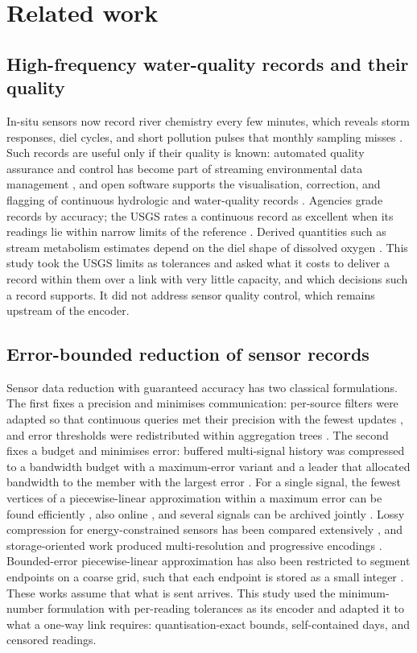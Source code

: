 \section{Related work}
\label{sec:related}

\subsection{High-frequency water-quality records and their quality}
In-situ sensors now record river chemistry every few minutes, which reveals storm responses, diel cycles, and short pollution pulses that monthly sampling misses \citep{rode2016}. Such records are useful only if their quality is known: automated quality assurance and control has become part of streaming environmental data management \citep{campbell2013}, and open software supports the visualisation, correction, and flagging of continuous hydrologic and water-quality records \citep{horsburgh2015}. Agencies grade records by accuracy; the USGS rates a continuous record as excellent when its readings lie within narrow limits of the reference \citep{wagner2006}. Derived quantities such as stream metabolism estimates depend on the diel shape of dissolved oxygen \citep{appling2018}. This study took the USGS limits as tolerances and asked what it costs to deliver a record within them over a link with very little capacity, and which decisions such a record supports. It did not address sensor quality control, which remains upstream of the encoder.

\subsection{Error-bounded reduction of sensor records}
Sensor data reduction with guaranteed accuracy has two classical formulations. The first fixes a precision and minimises communication: per-source filters were adapted so that continuous queries met their precision with the fewest updates \citep{olston2003}, and error thresholds were redistributed within aggregation trees \citep{deligiannakis2004}. The second fixes a budget and minimises error: buffered multi-signal history was compressed to a bandwidth budget with a maximum-error variant and a leader that allocated bandwidth to the member with the largest error \citep{deligiannakis2007}. For a single signal, the fewest vertices of a piecewise-linear approximation within a maximum error can be found efficiently \citep{imai1988,orourke1981}, also online \citep{soroush2008}, and several signals can be archived jointly \citep{gandhi2009}. Lossy compression for energy-constrained sensors has been compared extensively \citep{zordan2014}, and storage-oriented work produced multi-resolution and progressive encodings \citep{ganesan2003,barbarioli2023}. Bounded-error piecewise-linear approximation has also been restricted to segment endpoints on a coarse grid, such that each endpoint is stored as a small integer \citep{lin2019,lin2025}. These works assume that what is sent arrives. This study used the minimum-number formulation with per-reading tolerances as its encoder and adapted it to what a one-way link requires: quantisation-exact bounds, self-contained days, and censored readings.

